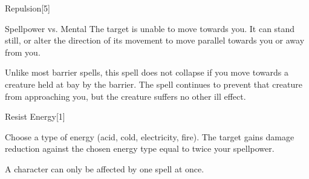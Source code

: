 \begin{spellsection}{Repulsion}[5]
    \begin{spellheader}
    \end{spellheader}
    \begin{spellcontent}
        \begin{spelltargetinginfo}
        \end{spelltargetinginfo}
        \begin{spelleffects}
            \begin{spellattack}{Spellpower vs. Mental}
                \spellsuccess The target is unable to move towards you. It can stand still, or alter the direction of its movement to move parallel towards you or away from you.
            \end{spellattack}
            \spelldur \durshort \dismissable
        \end{spelleffects}
    \end{spellcontent}
    \begin{spellfooter}
        \spellnotes Unlike most barrier spells, this spell does not collapse if you move towards a creature held at bay by the barrier. The spell continues to prevent that creature from approaching you, but the creature suffers no other ill effect.
        \miscastexplode
    \end{spellfooter}
\end{spellsection}

\begin{spellsection}{Resist Energy}[1]
    \begin{spellheader}
    \end{spellheader}
    \begin{spellcontent}
        \begin{spelltargetinginfo}
        \end{spelltargetinginfo}
        \begin{spelleffects}
            \spellspecial Choose a type of energy (acid, cold, electricity, fire).
            \spelleffect The target gains damage reduction against the chosen energy type equal to twice your spellpower.
            \spelldur \durpersonallong
        \end{spelleffects}
    \end{spellcontent}
    \begin{spellfooter}
        \spellnotes A character can only be affected by one  spell at once.
        \miscastexplode
    \end{spellfooter}
\end{spellsection}

